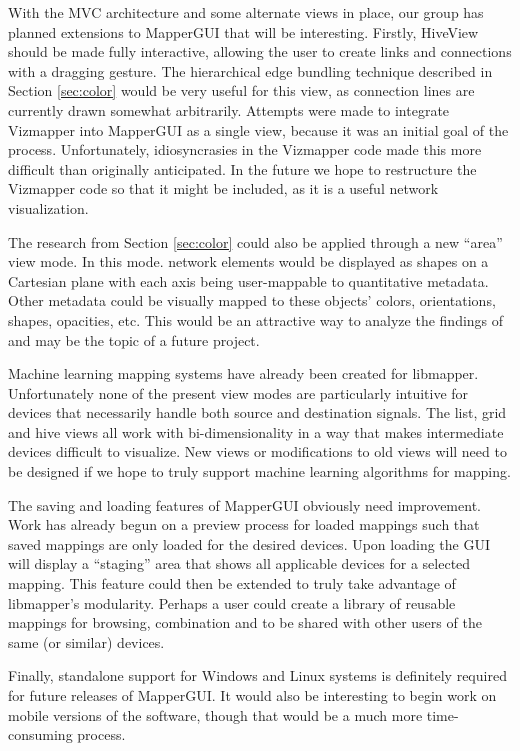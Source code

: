 With the MVC architecture and some alternate views in place, our group has planned extensions to MapperGUI that will be interesting. Firstly, HiveView should be made fully interactive, allowing the user to create links and connections with a dragging gesture. The hierarchical edge bundling technique described in Section \ref{sec:color} would be very useful for this view, as connection lines are currently drawn somewhat arbitrarily. Attempts were made to integrate Vizmapper into MapperGUI as a single view, because it was an initial goal of the process. Unfortunately, idiosyncrasies in the Vizmapper code made this more difficult than originally anticipated. In the future we hope to restructure the Vizmapper code so that it might be included, as it is a useful network visualization. 

The research from Section \ref{sec:color} could also be applied through a new ``area'' view mode. In this mode. network elements would be displayed as shapes on a Cartesian plane with each axis being user-mappable to quantitative metadata. Other metadata could be visually mapped to these objects' colors, orientations, shapes, opacities, etc. This would be an attractive way to analyze the findings of  and may be the topic of a future project. 

Machine learning mapping systems have already been created for libmapper. Unfortunately none of the present view modes are particularly intuitive for devices that necessarily handle both source and destination signals. The list, grid and hive views all work with bi-dimensionality in a way that makes intermediate devices difficult to visualize. New views or modifications to old views will need to be designed if we hope to truly support machine learning algorithms for mapping.

The saving and loading features of MapperGUI obviously need improvement. Work has already begun on a preview process for loaded mappings such that saved mappings are only loaded for the desired devices. Upon loading the GUI will display a ``staging'' area that shows all applicable devices for a selected mapping. This feature could then be extended to truly take advantage of libmapper's modularity. Perhaps a user could create a library of reusable mappings for browsing, combination and to be shared with other users of the same (or similar) devices. 

Finally, standalone support for Windows and Linux systems is definitely required for future releases of MapperGUI. It would also be interesting to begin work on mobile versions of the software, though that would be a much more time-consuming process. 



	